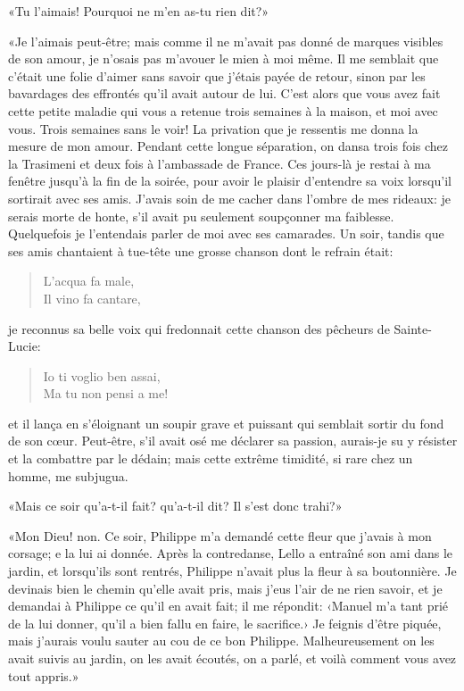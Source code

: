 «Tu l'aimais! Pourquoi ne m'en as-tu rien dit?»

«Je l'aimais peut-être; mais comme il ne m'avait pas donné de
marques visibles de son amour, je n'osais pas m'avouer le mien à moi
même. Il me semblait que c'était une folie d'aimer sans savoir que
j'étais payée de retour, sinon par les bavardages des effrontés qu'il
avait autour de lui. C'est alors que vous avez fait cette petite maladie
qui vous a retenue trois semaines à la maison, et moi avec vous. Trois
semaines sans le voir! La privation que je ressentis me donna la mesure
de mon amour. Pendant cette longue séparation, on dansa trois fois chez
la Trasimeni et deux fois à l'ambassade de France. Ces jours-là je
restai à ma fenêtre jusqu'à la fin de la soirée, pour avoir le plaisir
d'entendre sa voix lorsqu'il sortirait avec ses amis. J'avais soin de me
cacher dans l'ombre de mes rideaux: je serais morte de honte, s'il avait
pu seulement soupçonner ma faiblesse. Quelquefois je l'entendais parler
de moi avec ses camarades. Un soir, tandis que ses amis chantaient à
tue-tête une grosse chanson dont le refrain était:
\begin{quote}
L'acqua fa male,\\
Il vino fa cantare,
\end{quote}
je reconnus sa belle voix qui fredonnait cette chanson des pêcheurs de
Sainte-Lucie:
\begin{quote}
Io ti voglio ben assai, \\
Ma tu non pensi a me!
\end{quote}
et il lança en s'éloignant un soupir grave et puissant qui semblait
sortir du fond de son cœur. Peut-être, s'il avait osé me déclarer sa
passion, aurais-je su y résister et la combattre par le dédain; mais
cette extrême timidité, si rare chez un homme, me subjugua.

«Mais ce soir qu'a-t-il fait? qu'a-t-il dit? Il s'est donc trahi?»

«Mon Dieu! non. Ce soir, Philippe m'a demandé cette fleur que j'avais à
mon corsage; e la lui ai donnée. Après la contredanse, Lello a entraîné
son ami dans le jardin, et lorsqu'ils sont rentrés, Philippe n'avait
plus la fleur à sa boutonnière. Je devinais bien le chemin qu'elle avait
pris, mais j'eus l'air de ne rien savoir, et je demandai à Philippe ce
qu'il en avait fait; il me répondit: ‹Manuel m'a tant prié de la lui
donner, qu'il a bien fallu en faire, le sacrifice.› Je feignis d'être
piquée, mais j'aurais voulu sauter au cou de ce bon Philippe.
Malheureusement on les avait suivis au jardin, on les avait écoutés, on
a parlé, et voilà comment vous avez tout appris.»

